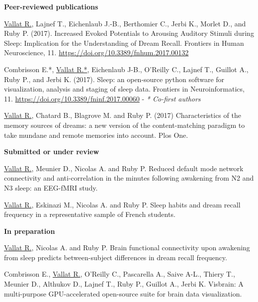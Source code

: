 \label{sec:publications}
\vspace*{-10mm}

\textbf{Peer-reviewed publications}

\underline{Vallat R.}, Lajnef T., Eichenlaub J.-B., Berthomier C., Jerbi K., Morlet D., and Ruby P. (2017). Increased Evoked Potentials to Arousing Auditory Stimuli during Sleep: Implication for the Understanding of Dream Recall. Frontiers in Human Neuroscience, 11. \url{https://doi.org/10.3389/fnhum.2017.00132}

Combrisson E.*, \underline{Vallat R.*}, Eichenlaub J-B., O'Reilly C., Lajnef T., Guillot A., Ruby P., and Jerbi K. (2017). Sleep: an open-source python software for visualization, analysis and staging of sleep data. Frontiers in Neuroinformatics, 11. \url{https://doi.org/10.3389/fninf.2017.00060} - \emph{* Co-first authors}

\underline{Vallat R.}, Chatard B., Blagrove M. and Ruby P. (2017) Characteristics of the memory sources of dreams: a new version
of the content-matching paradigm to take mundane and remote memories into account. Plos One.

\textbf{Submitted or under review}

\underline{Vallat R.}, Meunier D., Nicolas A. and Ruby P. Reduced default mode network connectivity and anti-correlation in the minutes following awakening from N2 and N3 sleep: an EEG-fMRI study.

\underline{Vallat R.}, Eskinazi M., Nicolas A. and Ruby P. Sleep habits and dream recall frequency in a representative sample
of French students.

\textbf{In preparation}

\underline{Vallat R.}, Nicolas A. and Ruby P. Brain functional connectivity upon awakening from sleep predicts between-subject differences in dream recall frequency.

Combrisson E., \underline{Vallat R.}, O'Reilly C., Pascarella A., Saive A-L., Thiery T., Meunier D., Althukov D., Lajnef T., Ruby P., Guillot A., Jerbi K. Visbrain: A multi-purpose GPU-accelerated open-source suite for brain data visualization.
